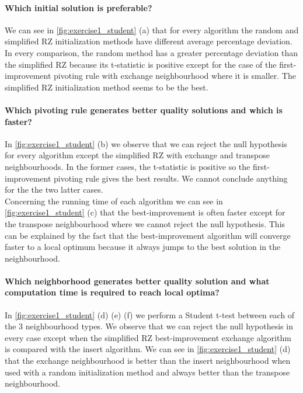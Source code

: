 \documentclass[a4paper,10pt]{article}
\begin{document}
\paragraph{Which initial solution is preferable?}

We can see in \ref{fig:exercise1_student} (a) that for every algorithm the random and simplified RZ initialization methods have different average percentage deviation. In every comparison, the random method has a greater percentage deviation than the simplified RZ because its t-statistic is positive except for the case of the first-improvement pivoting rule with exchange neighbourhood where it is smaller. The simplified RZ initialization method seems to be the best.

\paragraph{Which pivoting rule generates better quality solutions and which is faster?}

In \ref{fig:exercise1_student} (b) we observe that we can reject the null hypothesis for every algorithm except the simplified RZ with exchange and transpose neighbourhoods. In the former cases, the t-statistic is positive so the first-improvement pivoting rule gives the best results. We cannot conclude anything for the the two latter cases. \\

Concerning the running time of each algorithm we can see in \ref{fig:exercise1_student} (c) that the best-improvement is often faster except for the transpose neighbourhood where we cannot reject the null hypothesis. This can be explained by the fact that the best-improvement algorithm will converge faster to a local optimum because it always jumps to the best solution in the neighbourhood.

\paragraph{Which neighborhood generates better quality solution and what computation time is required to reach local optima?}

In \ref{fig:exercise1_student} (d) (e) (f) we perform a Student t-test between each of the 3 neighbourhood types. We observe that we can reject the null hypothesis in every case except when the simplified RZ best-improvement exchange algorithm is compared with the insert algorithm. We can see in \ref{fig:exercise1_student} (d) that the exchange neighbourhood is better than the insert neighbourhood when used with a random initialization method and always better than the transpose neighbourhood.
\end{document}
